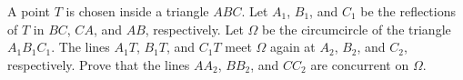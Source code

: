 A point $T$ is chosen inside a triangle $ABC$. Let $A_1$, $B_1$, and $C_1$ be the reflections of $T$ in $BC$, $CA$, and $AB$, respectively. Let $\Omega$ be the circumcircle of the triangle $A_1B_1C_1$. The lines $A_1T$, $B_1T$, and $C_1T$ meet $\Omega$ again at $A_2$, $B_2$, and $C_2$, respectively. Prove that the lines $AA_2$, $BB_2$, and $CC_2$ are concurrent on $\Omega$.

